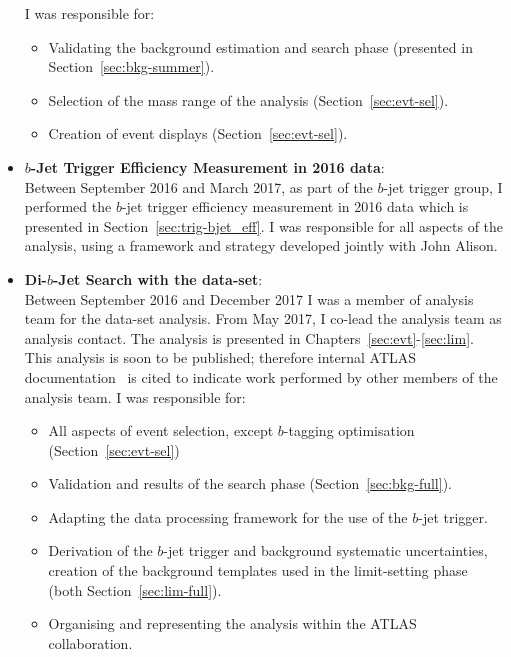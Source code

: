\begin{itemize}[leftmargin=*]
  I was responsible for:
  \begin{itemize}
    \item Validating the background estimation and search phase (presented in Section~\ref{sec:bkg-summer}).
    \item Selection of the mass range of the analysis (Section~\ref{sec:evt-sel}).
    \item Creation of event displays (Section~\ref{sec:evt-sel}).
  \end{itemize}
  \vspace{1em}
\item\textbf{$b$-Jet Trigger Efficiency Measurement in 2016 data}:\\
  Between September 2016 and March 2017, as part of the $b$-jet trigger group,
  I performed the $b$-jet trigger efficiency measurement in 2016 data which is presented in Section~\ref{sec:trig-bjet_eff}.
  I was responsible for all aspects of the analysis, using a framework and strategy developed jointly with John Alison.
  \vspace{1em}
\item\textbf{Di-$b$-Jet Search with the \lm{} data-set}:\\ 
  Between September 2016 and December 2017 I was a member of analysis team for the \lm{} data-set analysis.
  From May 2017, I co-lead the analysis team as analysis contact.
  The analysis is presented in Chapters~\ref{sec:evt}-\ref{sec:lim}.
  This analysis is soon to be published; therefore internal ATLAS documentation~\cite{dibjet-full_int} is cited to indicate work performed by other members of the analysis team.
  I was responsible for:
  \begin{itemize}
    \item All aspects of event selection, except $b$-tagging optimisation (Section~\ref{sec:evt-sel})
    \item Validation and results of the search phase (Section~\ref{sec:bkg-full}).
    \item Adapting the data processing framework for the use of the $b$-jet trigger.
    \item Derivation of the $b$-jet trigger and background systematic uncertainties,
      creation of the background templates used in the limit-setting phase (both Section~\ref{sec:lim-full}).
    \item Organising and representing the analysis within the ATLAS collaboration.

\end{itemize}
\end{itemize}
